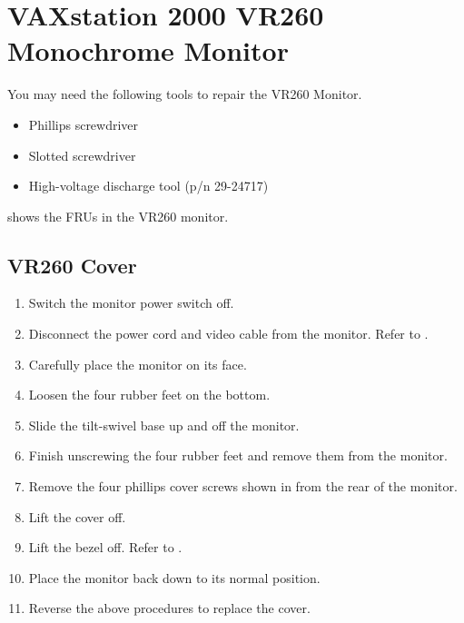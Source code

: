 \section{VAXstation 2000 VR260 Monochrome Monitor}

You may need the following tools to repair the VR260 Monitor.

\begin{itemize}
\item	Phillips screwdriver
\item	Slotted screwdriver
\item	High-voltage discharge tool (p/n 29-24717)
\end{itemize}

 shows the FRUs in the VR260 monitor.

\newpage

\subsection{VR260 Cover}

\begin{enumerate}

\item	Switch the monitor power switch off.

\item	Disconnect the power cord and video cable from the monitor. Refer to .


\item	Carefully place the monitor on its face.

\item	Loosen the four rubber feet on the bottom.

\item	Slide the tilt-swivel base up and off the monitor.

\item	Finish unscrewing the four rubber feet and remove them from the monitor.

\newpage

\item	Remove the four phillips cover screws shown in  from the rear of the monitor.


\item	Lift the cover off.

\newpage

\item	Lift the bezel off. Refer to .


\item	Place the monitor back down to its normal position.

\item	Reverse the above procedures to replace the cover.

\end{enumerate}

